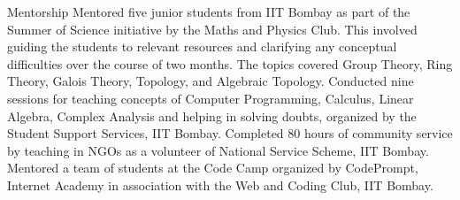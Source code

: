 \begin{rubric}{Mentorship}
	\entry*[2021] Mentored five junior students from IIT Bombay as part of the Summer of Science initiative by the Maths and Physics Club. This involved guiding the students to relevant resources and clarifying any conceptual difficulties over the course of two months. The topics covered Group Theory, Ring Theory, Galois Theory, Topology, and Algebraic Topology.
	\entry*[2020] Conducted nine sessions for teaching concepts of Computer Programming, Calculus, Linear Algebra, Complex Analysis and helping in solving doubts, organized by the Student Support Services, IIT Bombay. 
	\entry*[2019] Completed 80 hours of community service by teaching in NGOs as a volunteer of National Service Scheme, IIT Bombay.
	\entry*[2018] Mentored a team of students at the Code Camp organized by CodePrompt, Internet Academy in association with the Web and Coding Club, IIT Bombay.
\end{rubric}